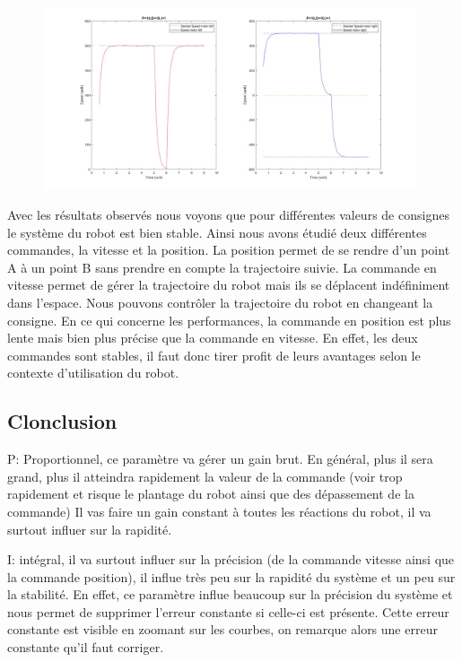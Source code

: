 \documentclass[a4paper]{article}
\begin{document}
		\begin{figure}[h]
			\centering
			\includegraphics[width = 11cm]{imgs/fig10.jpg}
			\caption{}
		\end{figure}
		Avec les résultats observés nous voyons que pour différentes valeurs de consignes le système du robot est bien stable. 
		Ainsi nous avons étudié deux différentes commandes, la vitesse et la position. 
		La position permet de se rendre d’un point A à un point B sans prendre en compte la trajectoire suivie.
		La commande en vitesse permet de gérer la trajectoire du robot mais ils se déplacent indéfiniment dans l’espace. Nous pouvons contrôler la trajectoire du robot en changeant la consigne. 
		En ce qui concerne les performances, la commande en position est plus lente mais bien plus précise que la commande en vitesse. En effet, les deux commandes sont stables, il faut donc tirer profit de leurs avantages selon le contexte d’utilisation du robot. 
		\newpage
	
	\subsection{Clonclusion}
	P: Proportionnel, ce paramètre va gérer un gain brut. En général, plus il sera grand, plus il atteindra rapidement
	la valeur de la commande (voir trop rapidement et risque le plantage du robot ainsi que des dépassement de la commande)
	Il vas faire un gain constant à toutes les réactions du robot, il va surtout influer sur la rapidité.
		
	I: intégral, il va surtout influer sur la précision (de la commande vitesse ainsi que la commande position), il influe très peu sur la rapidité du système et un peu sur la stabilité. En effet, ce paramètre influe beaucoup sur la précision du système et nous permet de supprimer l'erreur constante si celle-ci est présente. Cette erreur constante est visible en zoomant sur les courbes, on remarque alors une erreur constante qu'il faut corriger.
	
\end{document}

